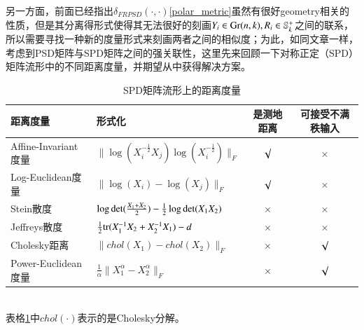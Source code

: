 另一方面，前面已经指出$\delta_{FRPSD}(\cdot,\cdot)$\ref{polar_metric}虽然有很好geometry相关的性质，但是其分离得形式使得其无法很好的刻画$Y_{i}\in {\rm Gr}(n,k),R_{i} \in \mathbb{S}_{k}^{+}$之间的联系，所以需要寻找一种新的度量形式来刻画两者之间的相似度；为此，如同文章\cite{PSD_Riemannian}一样，考虑到PSD矩阵与SPD矩阵之间的强关联性，这里先来回顾一下对称正定（SPD）矩阵流形中的不同距离度量，并期望从中获得解决方案。
\begin{table}[htb]
	\centering
	\caption{SPD矩阵流形上的距离度量}
	\begin{tabular}{llcc}
	\toprule[1.5pt]
		{\heiti 距离度量} &{\heiti 形式化} &{\heiti 是测地距离} &{\heiti 可接受不满秩输入}\\ \hline
		Affine-Invariant度量\cite{AIM_metric} &$\|\log(X_{i}^{-\frac{1}{2}}X_j)\log(X_{i}^{-\frac{1}{2}})\|_F$ &$\surd$ &$\times$ \\
		Log-Euclidean度量\cite{LEM_metric} &$\|\log(X_{i})-\log(X_{j})\|_F$ &$\surd$ &$\times$ \\
		Stein散度\cite{Stein_divergence} &$\log{\rm det}(\frac{X_1+X_2}{2})-\frac{1}{2}\log{\rm det}(X_1X_2)$ &$\times$ &$\times$ \\
		Jeffreys散度\cite{Jeffreys_divergence} &$\frac{1}{2}{\rm tr}(X_{1}^{-1}X_2+X_{2}^{-1}X_{1})-d$ &$\times$ &$\times$\\
		Cholesky距离\cite{Cholesky_distance} &$\|chol(X_1)-chol(X_2)\|_{F}$ &$\times$ &$\surd$\\
		Power-Euclidean度量\cite{Cholesky_distance} & $\frac{1}{\alpha}\|X_{1}^{\alpha}-X_{2}^{\alpha}\|_{F}$ &$\times$ &$\surd$\\
	\bottomrule[1.5pt]
	\end{tabular}
	\label{tab:SPD_metric_list}
\end{table}\\
表格\ref{tab:SPD_metric_list}中$chol(\cdot)$表示的是Cholesky分解。

